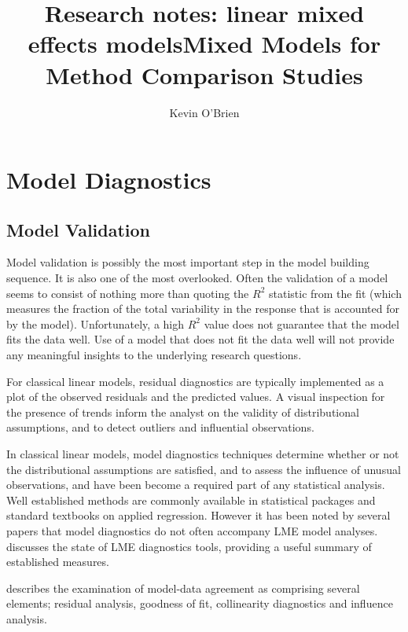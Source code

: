 \documentclass[12pt, a4paper]{report}
\title{Research notes: linear mixed effects models}
\author{ } \date{ }
\theoremstyle{plain}
\theoremstyle{definition}
\theoremstyle{remark}
\begin{document}
\author{Kevin O'Brien}
\title{Mixed Models for Method Comparison Studies}
\tableofcontents

\newpage

\chapter{Model Diagnostics}


\section{Model Validation}
Model validation is possibly the most important step in the model building sequence. It is also one of the most overlooked. Often the validation of a model seems to consist of nothing more than quoting the $R^2$ statistic from the fit (which measures the fraction of the total variability in the response that is accounted for by the model). Unfortunately, a high $R^2$ value does not guarantee that the model fits the data well. Use of a model that does not fit the data well will not provide any meaningful insights to the underlying research questions.

For classical linear models, residual diagnostics are typically implemented as a plot of the observed residuals and the predicted values. A visual inspection for the presence of trends inform the analyst on the validity of distributional assumptions, and to detect outliers and influential observations.

In classical linear models, model diagnostics techniques determine whether or not the distributional assumptions are satisfied, and to assess the influence of unusual observations, and have been become a required part of any statistical analysis. Well established methods are commonly available in statistical packages and standard textbooks on applied regression. However it has been noted by several papers that model diagnostics do not often accompany LME model analyses. \citet{schabenberger} discusses the state of LME diagnostics tools, providing a useful summary of established measures.

\citet{schabenberger} describes the examination of model-data agreement as comprising several elements; residual analysis, goodness of fit, collinearity diagnostics and influence analysis.
\end{document}
